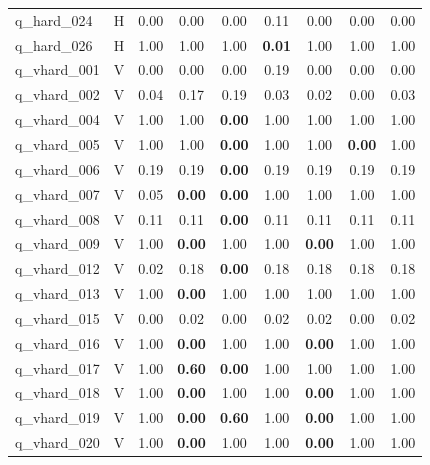 \documentclass{npj-compt.mater}
\begin{document}
\begin{table}[htbp]
\begin{tabular}{@{}llccccccc@{}}
    q\_hard\_024 & H & 0.00 & 0.00 & 0.00 & 0.11 & 0.00 & 0.00 & 0.00 \\
    q\_hard\_026 & H & 1.00 & 1.00 & 1.00 & \textbf{0.01} & 1.00 & 1.00 & 1.00 \\
    q\_vhard\_001 & V & 0.00 & 0.00 & 0.00 & 0.19 & 0.00 & 0.00 & 0.00 \\
    q\_vhard\_002 & V & 0.04 & 0.17 & 0.19 & 0.03 & 0.02 & 0.00 & 0.03 \\
    q\_vhard\_004 & V & 1.00 & 1.00 & \textbf{0.00} & 1.00 & 1.00 & 1.00 & 1.00 \\
    q\_vhard\_005 & V & 1.00 & 1.00 & \textbf{0.00} & 1.00 & 1.00 & \textbf{0.00} & 1.00 \\
    q\_vhard\_006 & V & 0.19 & 0.19 & \textbf{0.00} & 0.19 & 0.19 & 0.19 & 0.19 \\
    q\_vhard\_007 & V & 0.05 & \textbf{0.00} & \textbf{0.00} & 1.00 & 1.00 & 1.00 & 1.00 \\
    q\_vhard\_008 & V & 0.11 & 0.11 & \textbf{0.00} & 0.11 & 0.11 & 0.11 & 0.11 \\
    q\_vhard\_009 & V & 1.00 & \textbf{0.00} & 1.00 & 1.00 & \textbf{0.00} & 1.00 & 1.00 \\
    q\_vhard\_012 & V & 0.02 & 0.18 & \textbf{0.00} & 0.18 & 0.18 & 0.18 & 0.18 \\
    q\_vhard\_013 & V & 1.00 & \textbf{0.00} & 1.00 & 1.00 & 1.00 & 1.00 & 1.00 \\
    q\_vhard\_015 & V & 0.00 & 0.02 & 0.00 & 0.02 & 0.02 & 0.00 & 0.02 \\
    q\_vhard\_016 & V & 1.00 & \textbf{0.00} & 1.00 & 1.00 & \textbf{0.00} & 1.00 & 1.00 \\
    q\_vhard\_017 & V & 1.00 & \textbf{0.60} & \textbf{0.00} & 1.00 & 1.00 & 1.00 & 1.00 \\
    q\_vhard\_018 & V & 1.00 & \textbf{0.00} & 1.00 & 1.00 & \textbf{0.00} & 1.00 & 1.00 \\
    q\_vhard\_019 & V & 1.00 & \textbf{0.00} & \textbf{0.60} & 1.00 & \textbf{0.00} & 1.00 & 1.00 \\
    q\_vhard\_020 & V & 1.00 & \textbf{0.00} & 1.00 & 1.00 & \textbf{0.00} & 1.00 & 1.00 \\
  \bottomrule
\end{tabular}
\end{table}
\end{document}
